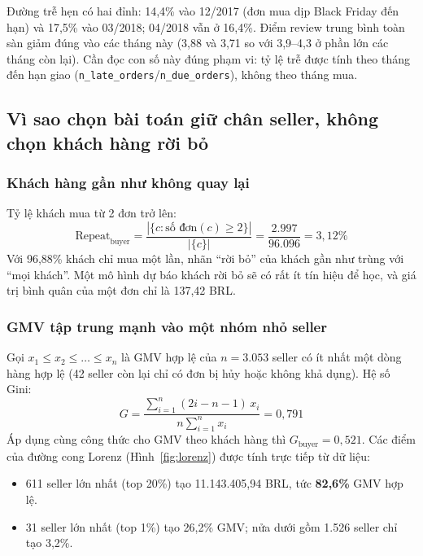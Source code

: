 Đường trễ hẹn có hai đỉnh: 14,4\% vào 12/2017 (đơn mua dịp Black Friday đến hạn) và 17,5\% vào 03/2018; 04/2018 vẫn ở 16,4\%. Điểm review trung bình toàn sàn giảm đúng vào các tháng này (3,88 và 3,71 so với 3,9--4,3 ở phần lớn các tháng còn lại). Cần đọc con số này đúng phạm vi: tỷ lệ trễ được tính theo tháng đến hạn giao (\texttt{n\_late\_orders}/\texttt{n\_due\_orders}), không theo tháng mua.

\subsection{Vì sao chọn bài toán giữ chân seller, không chọn khách hàng rời bỏ}

\subsubsection*{Khách hàng gần như không quay lại}
Tỷ lệ khách mua từ 2 đơn trở lên:
\begin{equation}
\text{Repeat}_{\text{buyer}} = \frac{|\{c : \text{số đơn}(c) \ge 2\}|}{|\{c\}|} = \frac{2.997}{96.096} = 3{,}12\%
\end{equation}
Với 96,88\% khách chỉ mua một lần, nhãn ``rời bỏ'' của khách gần như trùng với ``mọi khách''. Một mô hình dự báo khách rời bỏ sẽ có rất ít tín hiệu để học, và giá trị bình quân của một đơn chỉ là 137,42 BRL.

\subsubsection*{GMV tập trung mạnh vào một nhóm nhỏ seller}
Gọi $x_1 \le x_2 \le \dots \le x_n$ là GMV hợp lệ của $n = 3.053$ seller có ít nhất một dòng hàng hợp lệ (42 seller còn lại chỉ có đơn bị hủy hoặc không khả dụng). Hệ số Gini:
\begin{equation}
G = \frac{\sum_{i=1}^{n} (2i - n - 1)\, x_i}{n \sum_{i=1}^{n} x_i} = 0{,}791
\end{equation}
Áp dụng cùng công thức cho GMV theo khách hàng thì $G_{\text{buyer}} = 0{,}521$. Các điểm của đường cong Lorenz (Hình~\ref{fig:lorenz}) được tính trực tiếp từ dữ liệu:
\begin{itemize}
    \item 611 seller lớn nhất (top 20\%) tạo 11.143.405,94 BRL, tức \textbf{82,6\%} GMV hợp lệ.
    \item 31 seller lớn nhất (top 1\%) tạo 26,2\% GMV; nửa dưới gồm 1.526 seller chỉ tạo 3,2\%.
\end{itemize}


